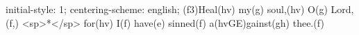 initial-style: 1;
centering-scheme: english;
(f3)Heal(hv) my(g) soul,(hv) O(g) Lord,(f,) <sp>*</sp> for(hv) I(f) have(e) sinned(f) a(hvGE)gainst(gh) thee.(f)
